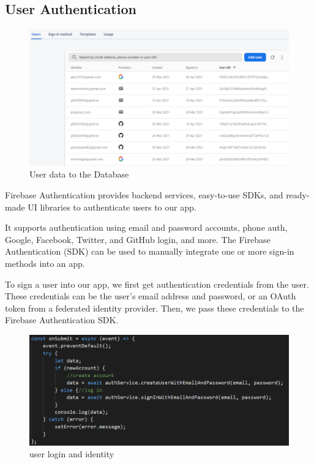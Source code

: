 \subsection{User Authentication}

\begin{figure}[ht]
    \centering
    \includegraphics[scale=0.5]{img/auth.PNG}
    \caption{User data to the Database}
    \label{fig:my_labe2}
\end{figure}

Firebase Authentication provides backend services, easy-to-use SDKs, and ready-made UI libraries to authenticate users to our app.

It supports authentication using email and password accounts, phone auth, Google, Facebook, Twitter, and GitHub login, and more. The Firebase Authentication (SDK) can be used to manually integrate one or more sign-in methods into an app.\cite{fbauth}

\vspace{5mm}

To sign a user into our app, we first get authentication credentials from the user. 
These credentials can be the user's email address and password, or an OAuth token from a federated identity provider. Then, we pass these credentials to the Firebase Authentication SDK. 

\begin{figure}[ht]
    \centering
    \includegraphics[scale=0.55]{img/login.PNG}
    \caption{user login and identity}
    \label{fig:my_labe3}
\end{figure}

